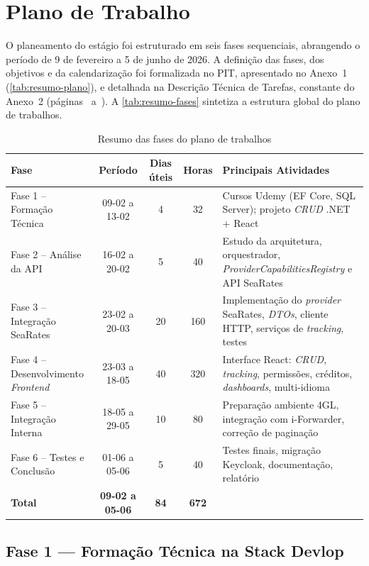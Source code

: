 \documentclass[a4paper,12pt]{report}
\begin{document}
\section{Plano de Trabalho}

O planeamento do estágio foi estruturado em seis fases sequenciais, abrangendo o período de 9 de fevereiro a 5 de junho de 2026. A definição das fases, dos objetivos e da calendarização foi formalizada no PIT, apresentado no Anexo~1 (\autoref{tab:resumo-plano}), e detalhada na Descrição Técnica de Tarefas, constante do Anexo~2 (páginas~\pageref{fig:tarefas-pag1} a~\pageref{fig:tarefas-pag5}). A \autoref{tab:resumo-fases} sintetiza a estrutura global do plano de trabalhos.

\begin{table}[H]
\centering
\caption{Resumo das fases do plano de trabalhos}
\label{tab:resumo-fases}
\small
\begin{tabular}{|p{}|c|c|c|p{}|}
\hline
\textbf{Fase} & \textbf{Período} & \textbf{Dias úteis} & \textbf{Horas} & \textbf{Principais Atividades} \\
\hline
Fase 1 -- Formação Técnica & 09-02 a 13-02 & 4 & 32 & Cursos Udemy (EF Core, SQL Server); projeto \textit{CRUD} .NET + React \\
\hline
Fase 2 -- Análise da API & 16-02 a 20-02 & 5 & 40 & Estudo da arquitetura, orquestrador, \textit{ProviderCapabilitiesRegistry} e API SeaRates \\
\hline
Fase 3 -- Integração SeaRates & 23-02 a 20-03 & 20 & 160 & Implementação do \textit{provider} SeaRates, \textit{DTOs}, cliente HTTP, serviços de \textit{tracking}, testes \\
\hline
Fase 4 -- Desenvolvimento \textit{Frontend} & 23-03 a 18-05 & 40 & 320 & Interface React: \textit{CRUD}, \textit{tracking}, permissões, créditos, \textit{dashboards}, multi-idioma \\
\hline
Fase 5 -- Integração Interna & 18-05 a 29-05 & 10 & 80 & Preparação ambiente 4GL, integração com i-Forwarder, correção de paginação \\
\hline
Fase 6 -- Testes e Conclusão & 01-06 a 05-06 & 5 & 40 & Testes finais, migração Keycloak, documentação, relatório \\
\hline
\textbf{Total} & \textbf{09-02 a 05-06} & \textbf{84} & \textbf{672} & \\
\hline
\end{tabular}
\end{table}

\subsection{Fase 1 --- Formação Técnica na Stack Devlop}
\end{document}
